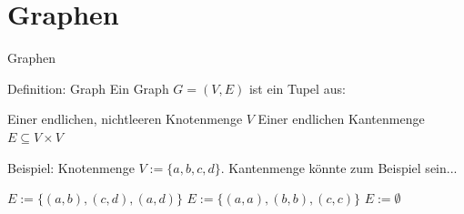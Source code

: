 \documentclass[handout]{beamer}
\begin{document}

\begin{frame}
	\titlepage
\end{frame}

\section{Graphen}
\begin{frame}{Graphen}
	\begin{block}{Definition: Graph}
		\ip Ein Graph $G = (V,E)$ ist ein Tupel aus:
		\begin{itemize}
			\pitem Einer endlichen, nichtleeren Knotenmenge $V$
			\pitem Einer endlichen Kantenmenge $E \subseteq V \times V$
		\end{itemize}
	\end{block}
	
	\bp
	
	Beispiel: Knotenmenge $V := \{a, b, c, d\}$. Kantenmenge könnte zum Beispiel sein...
	
	\begin{itemize}
		\pitem $E := \{(a,b), (c, d), (a, d)\}$
		\pitem $E := \{(a,a), (b,b), (c,c)\}$
		\pitem $E := \emptyset$
	\end{itemize}
\end{frame}
\end{document}
